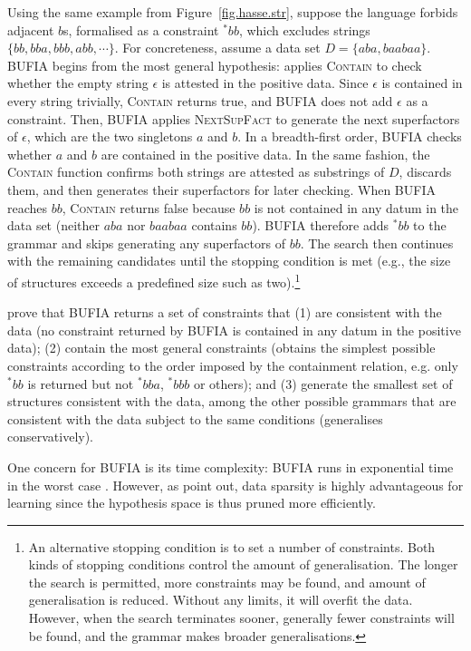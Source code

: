 Using the same example from Figure~\ref{fig.hasse.str}, suppose
the language forbids adjacent \(b\)s, formalised as a constraint
\(^*bb\), which excludes strings \(\{bb, bba, bbb, abb,
\cdots\}\). For concreteness, assume a data set \(D = 
\{aba, baabaa\}\).  BUFIA begins from the most general hypothesis:
applies \textsc{Contain} to check whether the empty string $\epsilon$
is attested in the positive data.  Since $\epsilon$ is contained in
every string trivially, \textsc{Contain} returns true, and BUFIA does
not add $\epsilon$ as a constraint. Then, BUFIA applies
\textsc{NextSupFact} to generate the next superfactors of $\epsilon$,
which are the two singletons \(a\) and \(b\). In a breadth-first
order, BUFIA checks whether \(a\) and \(b\) are contained in the
positive data.  In the same fashion, the \textsc{Contain} function
confirms both strings are attested as substrings of \(D\), discards
them, and then generates their superfactors for later checking. When
BUFIA reaches \(bb\), \textsc{Contain} returns false because
\(bb\) is not contained in any datum in the data set (neither \(aba\) nor 
\(baabaa\) contains \(bb\)). BUFIA therefore adds
\(^*bb\) to the grammar and skips generating any superfactors of
\(bb\). The search then continues with the remaining candidates until
the stopping condition is met (e.g., the size of structures exceeds a
predefined size such as two).\footnote{An alternative stopping
  condition is to set a number of constraints. Both kinds of stopping
  conditions control the amount of generalisation. The longer the
  search is permitted, more constraints may be found, and amount of
  generalisation is reduced. Without any limits, it will overfit the
  data. However, when the search terminates sooner, generally fewer
  constraints will be found, and the grammar makes broader
  generalisations.}

\citet{chandleeBufia2019} prove that BUFIA returns a set of
constraints that (1) are consistent with the data (no constraint
returned by BUFIA is contained in any datum in the positive data); (2)
contain the most general constraints (obtains the simplest possible
constraints according to the order imposed by the containment
relation, e.g.  only \(^*bb\) is returned but not \(^*bba\), \(^*bbb\)
or others); and (3) generate the smallest set of structures consistent
with the data, among the other possible grammars that are
consistent with the data subject to the same conditions (generalises
conservatively).

One concern for BUFIA is its time complexity: BUFIA runs in exponential time in the worst 
case \citep{chandleeBufia2019}. However, as \citet{Swanson+2025} 
point out, data sparsity is highly advantageous for learning since 
the hypothesis space is thus pruned more efficiently.

